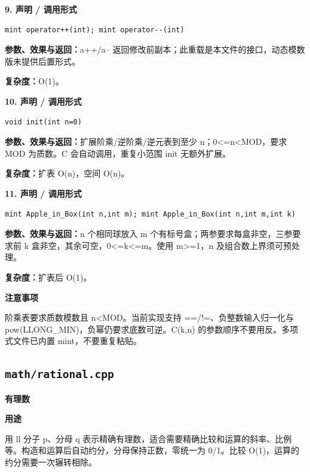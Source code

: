 \documentclass[UTF8,a4paper,10pt]{ctexart}
\newcommand{\TemplUsage}[1]{\textbf{用途}\par #1\par}
\newcommand{\TemplNote}[1]{\textbf{注意事项}\par #1\par}
\begin{document}
\noindent\begin{minipage}{\textwidth}
\textbf{9. 声明 / 调用形式}
\begin{lstlisting}
mint operator++(int); mint operator--(int)
\end{lstlisting}
\textbf{参数、效果与返回：}a++/a-- 返回修改前副本；此重载是本文件的接口，动态模数版未提供后置形式。

\textbf{复杂度：}O(1)。

\end{minipage}\par\vspace{0.4em}
\noindent\begin{minipage}{\textwidth}
\textbf{10. 声明 / 调用形式}
\begin{lstlisting}
void init(int n=0)
\end{lstlisting}
\textbf{参数、效果与返回：}扩展阶乘/逆阶乘/逆元表到至少 n；0<=n<MOD，要求 MOD 为质数。C 会自动调用，重复小范围 init 无额外扩展。

\textbf{复杂度：}扩表 O(n)，空间 O(n)。

\end{minipage}\par\vspace{0.4em}
\noindent\begin{minipage}{\textwidth}
\textbf{11. 声明 / 调用形式}
\begin{lstlisting}
mint Apple_in_Box(int n,int m); mint Apple_in_Box(int n,int m,int k)
\end{lstlisting}
\textbf{参数、效果与返回：}n 个相同球放入 m 个有标号盒；两参要求每盒非空，三参要求前 k 盒非空，其余可空，0<=k<=m。使用 m>=1，n 及组合数上界须可预处理。

\textbf{复杂度：}扩表后 O(1)。

\TemplNote{阶乘表要求质数模数且 n<MOD。当前实现支持 ==/!=、负整数输入归一化与 pow(LLONG\_MIN)，负幂仍要求底数可逆。C(k,n) 的参数顺序不要用反。多项式文件已内置 mint，不要重复粘贴。}
\end{minipage}\par\vspace{0.4em}
\clearpage
\subsection{\texttt{math/rational.cpp}}
\textbf{有理数}\par
\TemplUsage{用 ll 分子 p、分母 q 表示精确有理数，适合需要精确比较和运算的斜率、比例等。构造和运算后自动约分，分母保持正数，零统一为 0/1。比较 O(1)，运算的约分需要一次辗转相除。}
\end{document}
